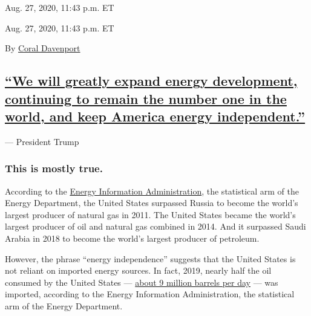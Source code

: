 Aug. 27, 2020, 11:43 p.m. ET

Aug. 27, 2020, 11:43 p.m. ET

By \href{https://www.nytimes3xbfgragh.onion/by/coral-davenport}{Coral
Davenport}

\hypertarget{we-will-greatly-expand-energy-development-continuing-to-remain-the-number-one-in-the-world-and-keep-america-energy-independent}{%
\subsection{\texorpdfstring{\protect\hyperlink{we-will-greatly-expand-energy-development-continuing-to-remain-the-number-one-in-the-world-and-keep-america-energy-independent}{``We
will greatly expand energy development, continuing to remain the number
one in the world, and keep America energy
independent.''}}{``We will greatly expand energy development, continuing to remain the number one in the world, and keep America energy independent.''}}\label{we-will-greatly-expand-energy-development-continuing-to-remain-the-number-one-in-the-world-and-keep-america-energy-independent}}

--- President Trump

\hypertarget{this-is-mostly-true}{%
\subsubsection{This is mostly true.}\label{this-is-mostly-true}}

According to the
\href{https://slack-redir.net/link?url=https\%3A\%2F\%2Fwww.eia.gov\%2Ftodayinenergy\%2Fdetail.php\%3Fid\%3D40973}{Energy
Information Administration}, the statistical arm of the Energy
Department, the United States surpassed Russia to become the world's
largest producer of natural gas in 2011. The United States became the
world's largest producer of oil and natural gas combined in 2014. And it
surpassed Saudi Arabia in 2018 to become the world's largest producer of
petroleum.

However, the phrase ``energy independence'' suggests that the United
States is not reliant on imported energy sources. In fact, 2019, nearly
half the oil consumed by the United States ---
\href{https://slack-redir.net/link?url=https\%3A\%2F\%2Fwww.eia.gov\%2Ftools\%2Ffaqs\%2Ffaq.php\%3Fid\%3D727\%26t\%3D6\%23\%3A~\%3Atext\%3DIn\%25202019\%252C\%2520the\%2520United\%2520States\%2C(including\%2520ethanol\%2520and\%2520biodiesel).}{about
9 million barrels per day} --- was imported, according to the Energy
Information Administration, the statistical arm of the Energy
Department.

